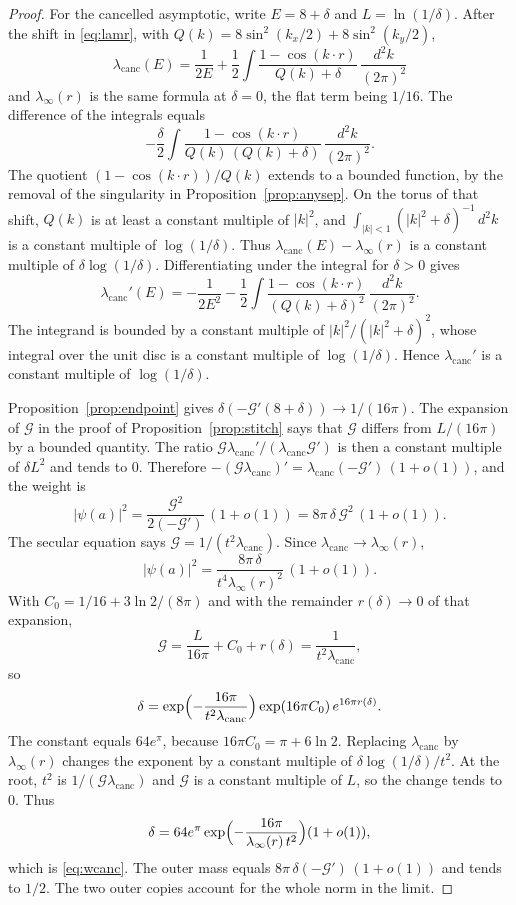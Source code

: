 \begin{proof}
For the cancelled asymptotic, write \(E=8+\delta\) and \(L=\ln(1/\delta)\).
After the shift in \eqref{eq:lamr}, with
\(Q(k)=8\sin^2(k_x/2)+8\sin^2(k_y/2)\),
\[
\lambda_{\mathrm{canc}}(E)
=\frac{1}{2E}
+\frac12\int\frac{1-\cos(k\cdot r)}{Q(k)+\delta}
\,\frac{d^2k}{(2\pi)^2}
\]
and \(\lambda_\infty(r)\) is the same formula at \(\delta=0\), the flat term
being \(1/16\).
The difference of the integrals equals
\[
-\frac{\delta}{2}\int
\frac{1-\cos(k\cdot r)}{Q(k)\,(Q(k)+\delta)}
\,\frac{d^2k}{(2\pi)^2}.
\]
The quotient \((1-\cos(k\cdot r))/Q(k)\) extends to a bounded function, by
the removal of the singularity in Proposition~\ref{prop:anysep}.
On the torus of that shift, \(Q(k)\) is at least a constant multiple of
\(|k|^2\), and \(\int_{|k|<1}(|k|^2+\delta)^{-1}\,d^2k\) is a constant
multiple of \(\log(1/\delta)\).
Thus \(\lambda_{\mathrm{canc}}(E)-\lambda_\infty(r)\) is a constant
multiple of \(\delta\log(1/\delta)\).
Differentiating under the integral for \(\delta>0\) gives
\[
\lambda_{\mathrm{canc}}'(E)
=-\frac{1}{2E^2}
-\frac12\int\frac{1-\cos(k\cdot r)}{(Q(k)+\delta)^2}
\,\frac{d^2k}{(2\pi)^2}.
\]
The integrand is bounded by a constant multiple of
\(|k|^2/(|k|^2+\delta)^2\), whose integral over the unit disc is a constant
multiple of \(\log(1/\delta)\).
Hence \(\lambda_{\mathrm{canc}}'\) is a constant multiple of
\(\log(1/\delta)\).

Proposition~\ref{prop:endpoint} gives
\(\delta(-\mathcal{G}'(8+\delta))\to 1/(16\pi)\).
The expansion of \(\mathcal{G}\) in the proof of
Proposition~\ref{prop:stitch} says that \(\mathcal{G}\) differs from
\(L/(16\pi)\) by a bounded quantity.
The ratio
\(\mathcal{G}\lambda_{\mathrm{canc}}'/(\lambda_{\mathrm{canc}}\mathcal{G}')\)
is then a constant multiple of \(\delta L^2\) and tends to \(0\).
Therefore
\(-(\mathcal{G}\lambda_{\mathrm{canc}})'
=\lambda_{\mathrm{canc}}(-\mathcal{G}')\,(1+o(1))\),
and the weight is
\[
|\psi(a)|^2
=\frac{\mathcal{G}^2}{2(-\mathcal{G}')}\,(1+o(1))
=8\pi\,\delta\,\mathcal{G}^2\,(1+o(1)).
\]
The secular equation says
\(\mathcal{G}=1/(t^2\lambda_{\mathrm{canc}})\).
Since \(\lambda_{\mathrm{canc}}\to\lambda_\infty(r)\),
\[
|\psi(a)|^2
=\frac{8\pi\,\delta}{t^4\lambda_\infty(r)^2}\,(1+o(1)).
\]
With \(C_0=1/16+3\ln 2/(8\pi)\) and with the remainder \(r(\delta)\to 0\) of
that expansion,
\[
\mathcal{G}
=\frac{L}{16\pi}+C_0+r(\delta)
=\frac{1}{t^2\lambda_{\mathrm{canc}}},
\]
so
\[
\delta
=\exp\Bigl(-\frac{16\pi}{t^2\lambda_{\mathrm{canc}}}\Bigr)
\exp(16\pi C_0)\,e^{16\pi r(\delta)}.
\]
The constant equals \(64 e^{\pi}\), because
\(16\pi C_0=\pi+6\ln 2\).
Replacing \(\lambda_{\mathrm{canc}}\) by \(\lambda_\infty(r)\) changes the
exponent by a constant multiple of
\(\delta\log(1/\delta)/t^2\).
At the root, \(t^2\) is \(1/(\mathcal{G}\lambda_{\mathrm{canc}})\) and
\(\mathcal{G}\) is a constant multiple of \(L\), so the change tends to
\(0\).
Thus
\[
\delta
=64 e^{\pi}
\exp\Bigl(-\frac{16\pi}{\lambda_\infty(r)\,t^2}\Bigr)
(1+o(1)),
\]
which is \eqref{eq:wcanc}.
The outer mass equals
\(8\pi\,\delta(-\mathcal{G}')\,(1+o(1))\) and tends to \(1/2\).
The two outer copies account for the whole norm in the limit.


\end{proof}
